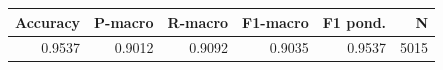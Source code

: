 \begin{tabular}{rrrrrr}
\toprule
\textbf{Accuracy} & \textbf{P-macro} & \textbf{R-macro} & \textbf{F1-macro} & \textbf{F1 pond.} & \textbf{N} \\
\midrule
0.9537 & 0.9012 & 0.9092 & 0.9035 & 0.9537 & 5015 \\
\bottomrule
\end{tabular}
